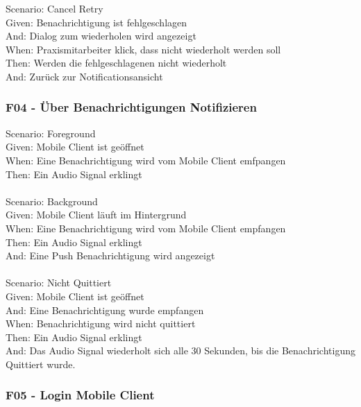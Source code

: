         Scenario: Cancel Retry\\
        Given:  Benachrichtigung ist fehlgeschlagen\\
        And:    Dialog zum wiederholen wird angezeigt\\
        When:   Praxismitarbeiter klick, dass nicht wiederholt werden soll\\
        Then:   Werden die fehlgeschlagenen nicht wiederholt\\
        And:    Zurück zur Notificationsansicht\\


    \subsubsection*{F04 - Über Benachrichtigungen Notifizieren}

        Scenario: Foreground\\
        Given:  Mobile Client ist geöffnet\\
        When:   Eine Benachrichtigung wird vom Mobile Client emfpangen\\
        Then:   Ein Audio Signal erklingt\\
        \\
        Scenario: Background\\
        Given:  Mobile Client läuft im Hintergrund\\
        When:   Eine Benachrichtigung wird vom Mobile Client empfangen\\
        Then:   Ein Audio Signal erklingt\\
        And:    Eine Push Benachrichtigung wird angezeigt\\
        \\
        Scenario: Nicht Quittiert\\
        Given:  Mobile Client ist geöffnet\\
        And:    Eine Benachrichtigung wurde empfangen\\
        When:   Benachrichtigung wird nicht quittiert\\
        Then:   Ein Audio Signal erklingt\\
        And:    Das Audio Signal wiederholt sich alle 30 Sekunden, bis die Benachrichtigung Quittiert wurde.\\


    \subsubsection*{F05 - Login Mobile Client}

